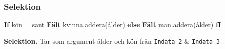 \documentclass[../main.tex]{subfiles}
\begin{document}
\subsubsection{Selektion}

\begin{algorithm}[H]
\SetAlgoLined


 \textbf{If} kön = sant\;
    \textbf{Fält} kvinna.addera(ålder)\;
 \textbf{else}\;
    \textbf{Fält} man.addera(ålder)\;
 \textbf{fI}
 
 \caption{\textbf{Selektion.} Tar som argument ålder och kön från \texttt{Indata 2} \& \texttt{Indata 3}}
 
\end{algorithm}
\end{document}

